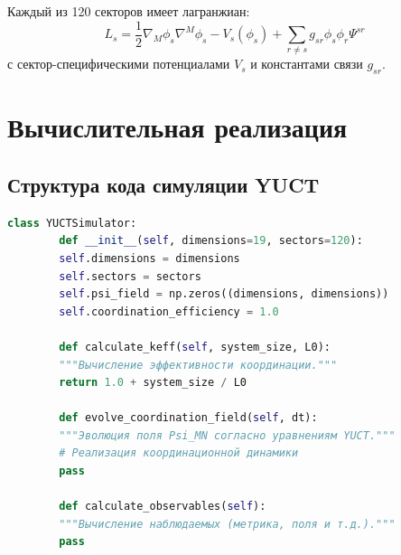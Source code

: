 \documentclass[12pt,a4paper]{article}
\theoremstyle{remark}
\begin{document}
	Каждый из 120 секторов имеет лагранжиан:
	\[
	L_s = \frac{1}{2} \nabla_M \phi_s \nabla^M \phi_s - V_s(\phi_s) + \sum_{r \neq s} g_{sr} \phi_s \phi_r \Psi^{sr}
	\]
	с сектор-специфическими потенциалами $V_s$ и константами связи $g_{sr}$.
	
	\section{Вычислительная реализация}
	\label{app:computational}
	
	\subsection{Структура кода симуляции YUCT}
	
	\begin{lstlisting}[language=Python, caption={Структура симуляции YUCT}, label={lst:simulation}]
		class YUCTSimulator:
		def __init__(self, dimensions=19, sectors=120):
		self.dimensions = dimensions
		self.sectors = sectors
		self.psi_field = np.zeros((dimensions, dimensions))
		self.coordination_efficiency = 1.0
		
		def calculate_keff(self, system_size, L0):
		"""Вычисление эффективности координации."""
		return 1.0 + system_size / L0
		
		def evolve_coordination_field(self, dt):
		"""Эволюция поля Psi_MN согласно уравнениям YUCT."""
		# Реализация координационной динамики
		pass
		
		def calculate_observables(self):
		"""Вычисление наблюдаемых (метрика, поля и т.д.)."""
		pass
	\end{lstlisting}
	
\end{document}
